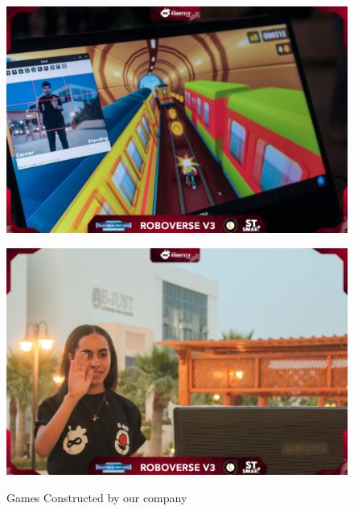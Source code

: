 \documentclass[11pt, twocolumn]{article}
\begin{document}
\begin{figure}[h]
    \centering
    \begin{minipage}{0.48\textwidth}
        \centering
        \includegraphics[width=\textwidth]{Images/Entertaining games.jpg}
        
        \label{fig:entertaining1}
    \end{minipage}
    \hfill
    \begin{minipage}{0.48\textwidth}
        \centering
        \includegraphics[width=\textwidth]{Images/Entertaining two.jpg}
      
        \label{fig:entertaining2}
    \end{minipage}
    \caption{Games Constructed by our company }
    \label{fig:entertaining}
\end{figure}
\end{document}
